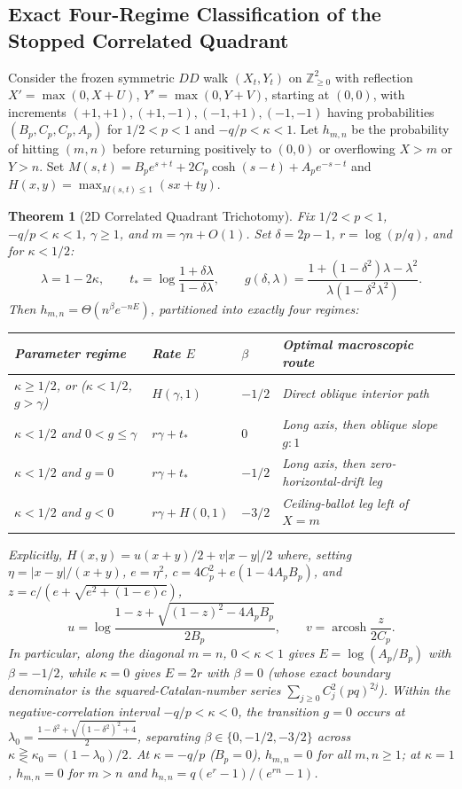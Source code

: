 \documentclass[11pt,reqno]{amsart}
\newtheorem{theorem}{Theorem}[section]
\theoremstyle{definition}
\theoremstyle{remark}
\newcommand{\Z}{\mathbb{Z}}
\DeclareMathOperator{\arcosh}{arcosh}
\begin{document}
\subsection{Exact Four-Regime Classification of the Stopped Correlated Quadrant}
Consider the frozen symmetric $DD$ walk $(X_t, Y_t)$ on $\Z_{\ge 0}^2$ with reflection $X' = \max(0, X+U)$, $Y' = \max(0, Y+V)$, starting at $(0,0)$, with increments $(+1,+1), (+1,-1), (-1,+1), (-1,-1)$ having probabilities $(B_p, C_p, C_p, A_p)$ for $1/2 < p < 1$ and $-q/p < \kappa < 1$. Let $h_{m,n}$ be the probability of hitting $(m,n)$ before returning positively to $(0,0)$ or overflowing $X > m$ or $Y > n$. Set $M(s,t) = B_p e^{s+t} + 2 C_p \cosh(s-t) + A_p e^{-s-t}$ and $H(x,y) = \max_{M(s,t)\le 1} (sx + ty)$.

\begin{theorem}[2D Correlated Quadrant Trichotomy]\label{thm:quadrant}
Fix $1/2 < p < 1$, $-q/p < \kappa < 1$, $\gamma \ge 1$, and $m = \gamma n + O(1)$. Set $\delta = 2p-1$, $r = \log(p/q)$, and for $\kappa < 1/2$:
\[
  \lambda = 1 - 2\kappa, \qquad
  t_* = \log\frac{1 + \delta\lambda}{1 - \delta\lambda}, \qquad
  g(\delta,\lambda) = \frac{1 + (1-\delta^2)\lambda - \lambda^2}{\lambda(1 - \delta^2\lambda^2)}.
\]
Then $h_{m,n} = \Theta(n^\beta e^{-n E})$, partitioned into exactly four regimes:
\begin{center}
\small
\begin{tabular}{@{}llll@{}}
\toprule
Parameter regime & Rate $E$ & $\beta$ & Optimal macroscopic route \\
\midrule
$\kappa \ge 1/2$, or ($\kappa < 1/2$, $g > \gamma$) & $H(\gamma,1)$ & $-1/2$ & Direct oblique interior path \\
$\kappa < 1/2$ and $0 < g \le \gamma$ & $r\gamma + t_*$ & $0$ & Long axis, then oblique slope $g:1$ \\
$\kappa < 1/2$ and $g = 0$ & $r\gamma + t_*$ & $-1/2$ & Long axis, then zero-horizontal-drift leg \\
$\kappa < 1/2$ and $g < 0$ & $r\gamma + H(0,1)$ & $-3/2$ & Ceiling-ballot leg left of $X=m$ \\
\bottomrule
\end{tabular}
\end{center}
Explicitly, $H(x,y) = u(x+y)/2 + v|x-y|/2$ where, setting $\eta = |x-y|/(x+y)$, $e=\eta^2$, $c=4C_p^2 + e(1-4A_p B_p)$, and $z = c/(e + \sqrt{e^2 + (1-e)c})$,
\[
  u = \log\frac{1 - z + \sqrt{(1-z)^2 - 4 A_p B_p}}{2 B_p}, \qquad
  v = \arcosh\frac{z}{2 C_p}.
\]
In particular, along the diagonal $m=n$, $0 < \kappa < 1$ gives $E = \log(A_p/B_p)$ with $\beta = -1/2$, while $\kappa = 0$ gives $E = 2r$ with $\beta = 0$ (whose exact boundary denominator is the squared-Catalan-number series $\sum_{j\ge 0} C_j^2 (pq)^{2j}$). Within the negative-correlation interval $-q/p < \kappa < 0$, the transition $g=0$ occurs at $\lambda_0 = \frac{1-\delta^2 + \sqrt{(1-\delta^2)^2 + 4}}{2}$, separating $\beta \in \{0, -1/2, -3/2\}$ across $\kappa \gtreqless \kappa_0 = (1-\lambda_0)/2$. At $\kappa = -q/p$ ($B_p = 0$), $h_{m,n} = 0$ for all $m,n\ge 1$; at $\kappa = 1$, $h_{m,n} = 0$ for $m>n$ and $h_{n,n} = q(e^r-1)/(e^{rn}-1)$.
\end{theorem}
\end{document}
